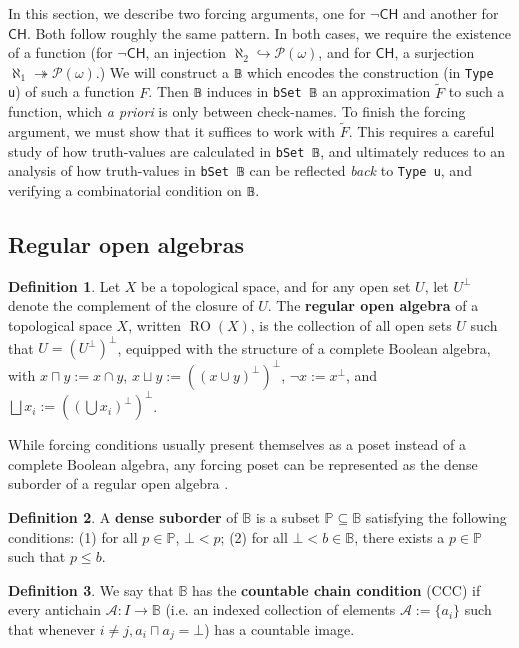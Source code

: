\documentclass[sigplan,10pt,review, anonymous]{acmart}
\newcommand{\B}{\mathbb{B}}
\newcommand{\lil}{\lstinline}
\newcommand{\CH}{\mathsf{CH}}
\theoremstyle{definition}
\newtheorem{defn}{Definition}[section]
\begin{document}
In this section, we describe two forcing arguments, one for \(\neg \CH\) and another for \(\CH\). Both follow roughly the same pattern. In both cases, we require the existence of a function (for \(\neg \CH\), an injection \(\aleph_2 \hookrightarrow \mathcal{P}(\omega)\), and for \(\CH\), a surjection \(\aleph_1 \twoheadrightarrow \mathcal{P}(\omega)\).) We will construct a \lil{𝔹}  which encodes the construction (in \lil{Type u}) of such a function \(F\). Then \lil{𝔹} induces in \lil{bSet 𝔹} an approximation \(\widetilde{F}\) to such a function, which \emph{a priori} is only between check-names. To finish the forcing argument, we must show that it suffices to work with \(\widetilde{F}\). This requires a careful study of how truth-values are calculated in \lil{bSet 𝔹}, and ultimately reduces to an analysis of how truth-values in \lil{bSet 𝔹} can be reflected \emph{back} to \lil{Type u}, and verifying a combinatorial condition on \lil{𝔹}.

\subsection{Regular open algebras}
\begin{defn}\label{def-regular-open-algebra}
  Let $X$ be a topological space, and for any open set $U$, let $U^\perp$ denote the complement of the closure of $U$. The \textbf{regular open algebra} of a topological space $X$, written $\operatorname{RO}(X)$, is the collection of all open sets $U$ such that $U = (U^\perp)^\perp$, equipped with the structure of a complete Boolean algebra, with $x \sqcap y := x \cap y$, $x \sqcup y := ((x \cup y)^\perp)^\perp$, $\neg x := x^\perp$, and $\bigsqcup x_i := ((\bigcup x_i)^\perp)^\perp$.
\end{defn}

While forcing conditions usually present themselves as a poset instead of a complete Boolean algebra, any forcing poset can be represented as the dense suborder of a regular open algebra \cite{moore2019method}.

\begin{defn}\label{def-dense-suborder}
  A \textbf{dense suborder} of \(\B\) is a subset \(\mathbb{P} \subseteq \B\) satisfying the following conditions: (1) for all \(p \in \mathbb{P}\), \(\bot < p\); (2) for all \(\bot < b \in \B\), there exists a \(p \in \mathbb{P}\) such that \(p \leq b\).
\end{defn}

\begin{defn}\label{def-ccc}
We say that $\B$ has the \textbf{countable chain condition} (CCC) if every antichain $\mathcal{A} : I \to \B$ (i.e. an indexed collection of elements $\mathcal{A} := \{a_i\}$ such that whenever $i \neq j, a_i \sqcap a_j = \bot$) has a countable image.
\end{defn}
\end{document}

